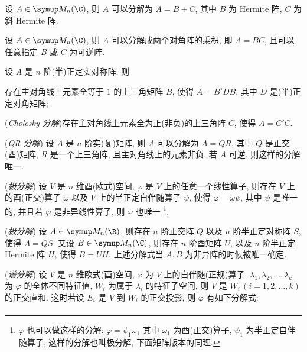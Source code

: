   \begin{tcolorbox}[title={矩阵/线性算子分解}]
      \begin{exercise}[resume=exer]
          \item 设 $ A \in \MM[\C] $, 则 $ A $ 可以分解为 $ A = B + C $, 其中 $ B $ 为 Hermite 阵, $ C $ 为斜 Hermite 阵.
          \item 设 $ A\in \MM[\C] $, 则 $ A $ 可以分解成两个对角阵的乘积, 即 $ A = BC $, 且可以任意指定 $ B $ 或 $ C $ 为可逆阵.
          \item 设 $ A $ 是 $ n $ 阶(半)正定实对称阵, 则
          \begin{exercise}
              \item 存在主对角线上元素全等于 $ 1 $ 的上三角矩阵 $ B $, 使得 $ A = B'DB $, 其中 $ D $ 是(半)正定对角矩阵;
              \item (\emph{Cholesky 分解})存在主对角线上元素全为正(非负)的上三角阵 $ C $, 使得 $ A = C'C $.
          \end{exercise}
          \item (\emph{QR 分解}) 设 $ A $ 是 $ n $ 阶实(复)矩阵, 则 $ A $ 可以分解为 $ A = QR $, 其中 $ Q $ 是正交(酉)矩阵, $ R $ 是一个上三角阵, 且主对角线上的元素非负, 若 $ A $ 可逆, 则这样的分解唯一.
          \item (\emph{极分解}) 设 $ V $ 是 $ n $ 维酉(欧式)空间, $ \varphi $ 是 $ V $ 上的任意一个线性算子, 则存在 $ V $ 上的酉(正交)算子 $ \omega $ 以及 $ V $ 上的半正定自伴随算子 $ \psi $, 使得 $ \varphi = \omega\psi $, 其中 $ \psi $ 是唯一的, 并且若 $ \varphi $ 是非异线性算子, 则 $ \omega $ 也唯一 \footnote{ $ \varphi $ 也可以做这样的分解: $ \varphi = \psi_{1}\omega_{1} $ 其中 $ \omega_{1} $ 为酉(正交)算子, $ \psi_{1} $ 为半正定自伴随算子, 这样的分解也叫极分解, 下面矩阵版本的同理.}.
          \item \label{item:矩阵极分解}(\emph{极分解}) 设 $ A \in \MM $, 则存在 $ n $ 阶正交阵 $ Q $ 以及 $ n $ 阶半正定对称阵 $ S $, 使得 $ A = QS $. 又设 $ B \in \MM[\C] $, 则存在 $ n $ 阶酉矩阵 $ U $, 以及 $ n $ 阶半正定 Hermite 阵 $ H $, 使得 $ B = UH $, 上述分解式当 $ A, B $ 为非异阵的时候被唯一确定.
          \item (\emph{谱分解}) 设 $ V $ 是 $ n $ 维欧式(酉)空间, $ \varphi $ 为 $ V $ 上的自伴随(正规)算子. $ \lambda_{1}, \lambda_{2}, \dots, \lambda_{k} $ 为 $ \varphi $ 的全体不同特征值, $ W_{i} $ 为属于 $ \lambda_{i} $ 的特征子空间, 则 $ V $ 是 $ W_{i}\,(i = 1, 2, \dots, k) $ 的正交直和. 这时若设 $ E_{i} $ 是 $ V $ 到 $ W_{i} $ 的正交投影, 则 $ \varphi $ 有如下分解式:
          \begin{align*}

\end{align*}
\end{exercise}
\end{tcolorbox}
